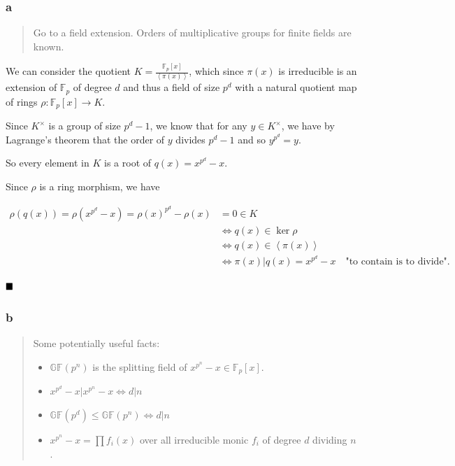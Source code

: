 \begin{solution}

\hypertarget{a-54}{%
\subsubsection{a}\label{a-54}}

\begin{quote}
Go to a field extension. Orders of multiplicative groups for finite
fields are known.
\end{quote}

We can consider the quotient
\(K = \displaystyle{\frac{{\mathbb{F}}_p[x]}{\left\langle{\pi(x)}\right\rangle}}\),
which since \(\pi(x)\) is irreducible is an extension of
\({\mathbb{F}}_p\) of degree \(d\) and thus a field of size \(p^d\) with
a natural quotient map of rings \(\rho: {\mathbb{F}}_p[x] \to K\).

Since \(K^{\times}\) is a group of size \(p^d-1\), we know that for any
\(y \in K^{\times}\), we have by Lagrange's theorem that the order of
\(y\) divides \(p^d-1\) and so \(y^{p^d} = y\).

So every element in \(K\) is a root of \(q(x) = x^{p^d}-x\).

Since \(\rho\) is a ring morphism, we have

\begin{align*}
\rho(q(x)) = \rho(x^{p^d} - x) = \rho(x)^{p^d} - \rho(x)
&= 0 \in K \\
&\iff q(x) \in \ker \rho \\
&\iff q(x) \in \left\langle{\pi(x)}\right\rangle \\
&\iff \pi(x) \mathrel{\Big|}q(x) = x^{p^d}-x \quad\text{"to contain is to divide"}
.\end{align*}

\(\hfill\blacksquare\)

\hypertarget{b-44}{%
\subsubsection{b}\label{b-44}}

\begin{quote}
Some potentially useful facts:

\begin{itemize}
\tightlist
\item
  \({\mathbb{GF}}(p^n)\) is the splitting field of
  \(x^{p^n} - x \in {\mathbb{F}}_p[x]\).
\item
  \(x^{p^d} - x \mathrel{\Big|}x^{p^n} - x \iff d \mathrel{\Big|}n\)
\item
  \({\mathbb{GF}}(p^d) \leq {\mathbb{GF}}(p^n) \iff d\mathrel{\Big|}n\)
\item
  \(x^{p^n} - x = \prod f_i(x)\) over all irreducible monic \(f_i\) of
  degree \(d\) dividing \(n\).
\end{itemize}
\end{quote}


\end{solution}
